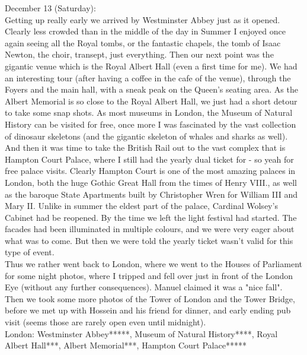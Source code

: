 December 13 (Saturday):\\
Getting up really early we arrived by Westminster Abbey just as it opened. Clearly less crowded than in the middle of the day in Summer I enjoyed once again seeing all the Royal tombs, or the fantastic chapels, the tomb of Isaac Newton, the choir, transept, just everything. Then our next point was the gigantic venue which is the Royal Albert Hall (even a first time for me). We had an interesting tour (after having a coffee in the cafe of the venue), through the Foyers and the main hall, with a sneak peak on the Queen's seating area. As the Albert Memorial is so close to the Royal Albert Hall, we just had a short detour to take some snap shots. As most museums in London, the Museum of Natural History can be visited for free, once more I was fascinated by the vast collection of dinosaur skeletons (and the gigantic skeleton of whales and sharks as well). \\ 
And then it was time to take the British Rail out to the vast complex that is Hampton Court Palace, where I still had the yearly dual ticket for - so yeah for free palace visits. Clearly Hampton Court is one of the most amazing palaces in London, both the huge Gothic Great Hall from the times of Henry VIII., as well as the baroque State Apartments built by Christopher Wren for William III and Mary II. Unlike in summer the eldest part of the palace, Cardinal Wolsey's Cabinet had be reopened. By the time we left the light festival had started. The facades had been illuminated in multiple colours, and we were very eager about what was to come. But then we were told the yearly ticket wasn't valid for this type of event.\\
Thus we rather went back to London, where we went to the Houses of Parliament for some night photos, where I tripped and fell over just in front of the London Eye (without any further consequences). Manuel claimed it was a "nice fall". Then we took some more photos of the Tower of London and the Tower Bridge, before we met up with Hossein and his friend for dinner, and early ending pub visit (seems those are rarely open even until midnight).\\

London: Westminster Abbey*****, Museum of Natural History****, Royal Albert Hall***, Albert Memorial***, Hampton Court Palace*****\\

